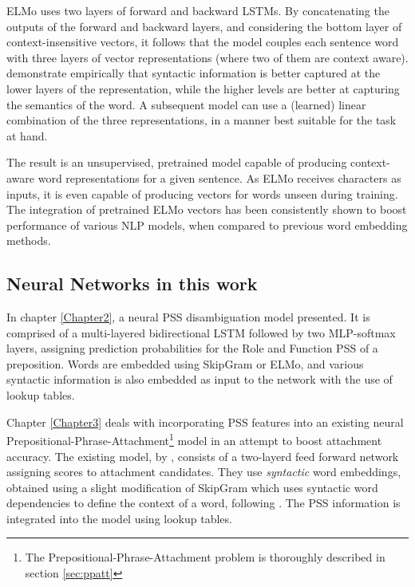 ELMo uses two layers of forward and backward LSTMs. By concatenating the outputs of the forward and backward layers, and considering the bottom layer of context-insensitive vectors, it follows that the model couples each sentence word with three layers of vector representations (where two of them are context aware). \cite{elmo} demonstrate empirically that syntactic information is better captured at the lower layers of the representation, while the higher levels are better at capturing the semantics of the word.  A subsequent model can use a (learned) linear combination of the three representations, in a manner best suitable for the task at hand. 

The result is an unsupervised, pretrained model capable of producing context-aware word representations for a given sentence. As ELMo receives characters as inputs, it is even capable of producing vectors for words unseen during training. The integration of pretrained ELMo vectors has been consistently shown to boost performance of various NLP models, when compared to previous word embedding methods. 

\subsection{Neural Networks in this work}

In chapter \ref{Chapter2}, a neural PSS disambiguation model presented. It is comprised of a multi-layered bidirectional LSTM followed by two MLP-softmax layers, assigning prediction probabilities for the Role and Function PSS of a preposition. Words are embedded using SkipGram or ELMo, and various syntactic information is also embedded as input to the network with the use of lookup tables. 

Chapter \ref{Chapter3} deals with incorporating PSS features into an existing neural Prepositional-Phrase-Attachment\footnote{The Prepositional-Phrase-Attachment problem is thoroughly described in section \ref{sec:ppatt}} model in an attempt to boost attachment accuracy. The existing model, by \cite{hpcd}, consists of a two-layerd feed forward network assigning scores to attachment candidates. They use \emph{syntactic} word embeddings, obtained using a slight modification of SkipGram which uses syntactic word dependencies to define the context of a word, following \cite{bansal}. The PSS information is integrated into the model using lookup tables.

\pagebreak

